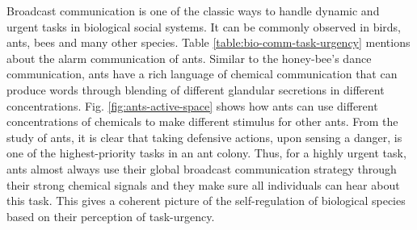 Broadcast communication is one of the classic ways to handle dynamic and urgent tasks in biological social systems. It can be commonly observed in birds, ants, bees and many other species. Table \ref{table:bio-comm-task-urgency} mentions about the alarm communication of ants. Similar to the honey-bee's dance communication, ants have a rich language of chemical communication that can produce words through blending of different glandular secretions in different concentrations. Fig. \ref{fig:ants-active-space} shows how ants can use different concentrations of chemicals to make different stimulus for other ants. From the study of ants, it is clear that taking defensive actions, upon sensing a danger, is one of the highest-priority tasks in an ant colony. Thus, for a highly urgent task, ants almost always use their global broadcast communication strategy through their strong chemical signals and they make sure all individuals can hear about this task.  This gives a coherent picture of the self-regulation of biological species based on their perception of task-urgency.
